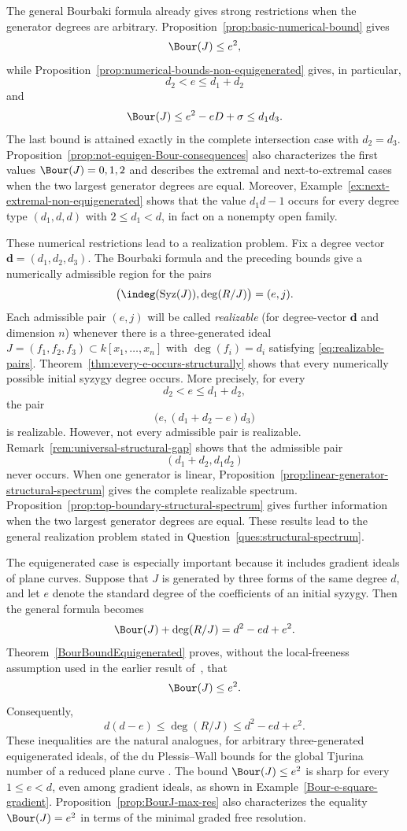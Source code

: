 \documentclass[11pt]{amsart} %
\theoremstyle{definition}
\def\syz{\mbox{\rm Syz}}
\begin{document}
The general Bourbaki formula already gives strong restrictions when the
generator degrees are arbitrary. Proposition~\ref{prop:basic-numerical-bound}
gives
\[
\Bour(J)\le e^2,
\]
while Proposition~\ref{prop:numerical-bounds-non-equigenerated} gives,
in particular,
\[
d_2<e\le d_1+d_2
\]
and
\[
\Bour(J)\le e^2-eD+\sigma\le d_1d_3.
\]
The last bound is attained exactly in the complete intersection case
with $d_2=d_3$. Proposition~\ref{prop:not-equigen-Bour-consequences}
also characterizes the first values $\Bour(J)=0,1,2$ and describes the
extremal and next-to-extremal cases when the two largest generator
degrees are equal. Moreover,
Example~\ref{ex:next-extremal-non-equigenerated} shows that the value
$d_1d-1$ occurs for every degree type $(d_1,d,d)$ with
$2\le d_1<d$, in fact on a nonempty open family.

These numerical restrictions lead to a realization problem. Fix a
degree vector $\mathbf d=(d_1,d_2,d_3)$. The Bourbaki formula and the preceding bounds give a numerically admissible region for the pairs
\begin{equation}\label{eq:realizable-pairs}
\bigl(\indeg(\syz(J)),\deg(R/J)\bigr) = (e,j).    
\end{equation}
Each admissible pair $(e,j)$ will be called \emph{realizable} (for degree-vector $\textbf{d}$ and dimension $n$) whenever there is a three-generated ideal $J = (f_1, f_2, f_3) \subset k[x_1, \ldots, x_n]$ with $\deg(f_i) = d_i$ satisfying \eqref{eq:realizable-pairs}.  Theorem~\ref{thm:every-e-occurs-structurally} shows that every
numerically possible initial syzygy degree occurs. More precisely, for
every
\[
d_2<e\le d_1+d_2,
\]
the pair
\[
\bigl(e,(d_1+d_2-e)d_3\bigr)
\]
is realizable. However, not every admissible pair is realizable.
Remark~\ref{rem:universal-structural-gap} shows that the admissible pair
\[
(d_1+d_2,d_1d_2)
\]
never occurs. When one generator is linear,
Proposition~\ref{prop:linear-generator-structural-spectrum} gives the
complete realizable spectrum. Proposition~\ref{prop:top-boundary-structural-spectrum}
gives further information when the two largest generator degrees are
equal. These results lead to the general realization problem stated in
Question~\ref{ques:structural-spectrum}.

The equigenerated case is especially important because it includes
gradient ideals of plane curves. Suppose that $J$ is generated by three
forms of the same degree $d$, and let $e$ denote the standard degree of
the coefficients of an initial syzygy. Then the general formula becomes
\[
\Bour(J)+\deg(R/J)=d^2-ed+e^2.
\]
Theorem~\ref{BourBoundEquigenerated} proves, without the local-freeness
assumption used in the earlier result of~\cite[Theorem~3.3]{MFA}, that
\[
\Bour(J)\le e^2.
\]
Consequently,
\[
d(d-e)\le\deg(R/J)\le d^2-ed+e^2.
\]
These inequalities are the natural analogues, for arbitrary
three-generated equigenerated ideals, of the du Plessis--Wall bounds
for the global Tjurina number of a reduced plane curve
\cite[Theorem 3.2]{CTC-Plessis}. The bound $\Bour(J)\le e^2$ is sharp for every
$1\le e<d$, even among gradient ideals, as shown in
Example~\ref{Bour-e-square-gradient}. Proposition~\ref{prop:BourJ-max-res}
also characterizes the equality $\Bour(J)=e^2$ in terms of the minimal
graded free resolution.
\end{document}
